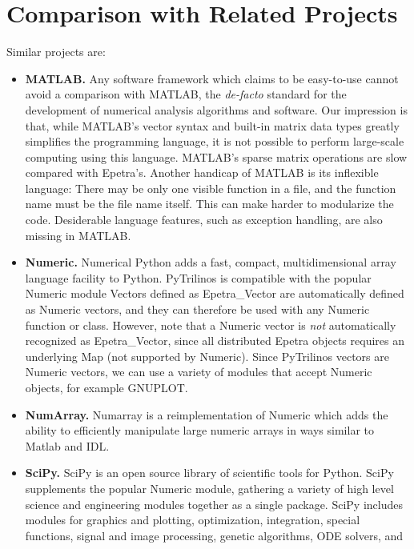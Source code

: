 \documentclass[10pt,relax]{SANDreport}
\begin{document}
\section{Comparison with Related Projects}
\label{sec:related}

Similar projects are:
\begin{itemize}
\item {\bf MATLAB.} Any software framework which claims to be easy-to-use
cannot avoid a comparison with MATLAB, the {\sl de-facto} standard for the
development of numerical analysis algorithms and software. Our impression is that, while MATLAB's vector syntax and
built-in matrix data types greatly simplifies the programming language, it is
not possible to perform large-scale computing using this language. MATLAB's
sparse matrix operations are slow compared with Epetra's. Another handicap of
MATLAB is its inflexible language: There may be only one visible function in a
file, and the function name must be the file name itself. This can make harder
to modularize the code. Desiderable language features, such as exception
handling, are also missing in MATLAB.
%
\item {\bf Numeric.} Numerical Python adds a fast, compact, multidimensional array language facility to Python.
PyTrilinos is compatible with the popular Numeric module
Vectors defined as Epetra\_Vector are automatically defined as Numeric
vectors, and they can therefore be used with any Numeric function or class.
However, note that a Numeric vector is {\sl not} automatically recognized as
Epetra\_Vector, since all distributed Epetra objects requires an underlying
Map (not supported by Numeric). Since PyTrilinos vectors are Numeric vectors,
  we can use a variety of modules that accept Numeric objects, for example
  GNUPLOT.
%
\item  {\bf NumArray.} 
Numarray is a reimplementation of Numeric which adds the ability to
efficiently manipulate large numeric arrays in ways similar to Matlab and IDL.
%
\item {\bf SciPy.} SciPy is an open source library of scientific tools for
Python. SciPy supplements the popular Numeric module, gathering a variety of
high level science and engineering modules together as a single package. SciPy
includes modules for graphics and plotting, optimization, integration, special
functions, signal and image processing, genetic algorithms, ODE solvers, and

\end{itemize}
\end{document}
